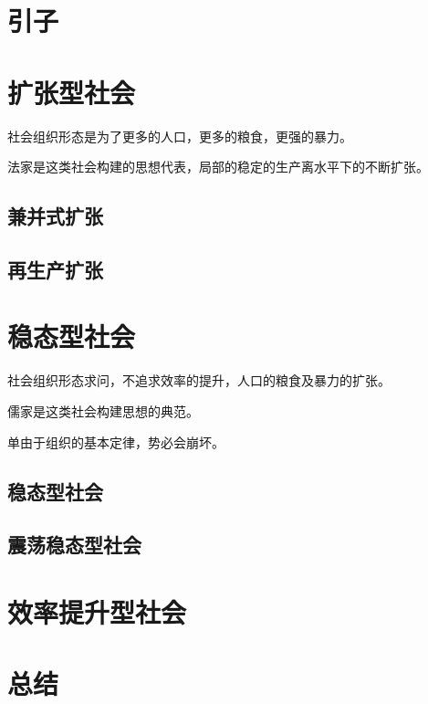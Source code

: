 \section{引子}
\section{扩张型社会}
社会组织形态是为了更多的人口，更多的粮食，更强的暴力。

法家是这类社会构建的思想代表，局部的稳定的生产离水平下的不断扩张。
\subsection{兼并式扩张}
\subsection{再生产扩张}

\section{稳态型社会}
社会组织形态求问，不追求效率的提升，人口的粮食及暴力的扩张。

儒家是这类社会构建思想的典范。

单由于组织的基本定律，势必会崩坏。
\subsection{稳态型社会}
\subsection{震荡稳态型社会}

\section{效率提升型社会}

\section{总结}

